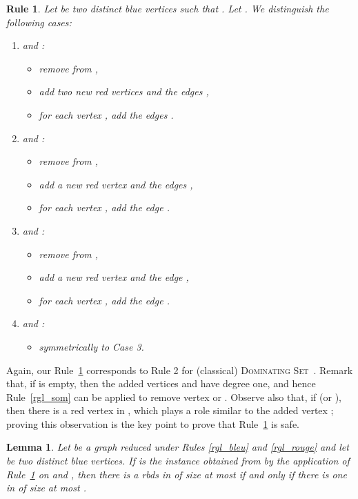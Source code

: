 \documentclass[a4paper,11pt]{article}
\newtheorem{lem}  {Lemma}
\newtheorem{rgl}  {Rule}
\newcommand{\rrgl}   [1] {Rule~\ref{#1}\xspace}
\newcommand{\dom}    [0] {\textsc{Dominating Set}\xspace}
\newcommand{\drb}    [0] {rbds\xspace}
\begin{document}
\begin{rgl}  \label{rgl_pair}            Let  be two distinct blue vertices such that .
Let .
We distinguish the following cases:
\begin{enumerate}

\item  and :

\begin{itemize}\itemsep0em
\item remove  from ,
\item add two new red vertices  and the edges ,
\item for each vertex , add the edges .
\end{itemize}



\item  and :

\begin{itemize}\itemsep0em
\item remove  from ,
\item add a new red vertex  and the edges ,
\item for each vertex {}, add the edge .
\end{itemize}

\item  and :

\begin{itemize}\itemsep0em
\item remove  from ,
\item add a new red vertex  and the edge ,
\item for each vertex {}, add the edge .


\end{itemize}

\item  and :

\begin{itemize}
\item symmetrically to Case 3.
\end{itemize}


\end{enumerate}
\end{rgl}





Again, our \rrgl{rgl_pair} corresponds to Rule 2 for (classical) \dom~\cite{AFN04}. Remark that, if  is empty, then the added vertices  and  have degree one, and hence \rrgl{rgl_som} can be applied to remove vertex  or . Observe also that, if  (or  ), then there is a red vertex in , which plays a role similar to the added vertex ; proving this observation is the key point to prove that \rrgl{rgl_pair} is safe. \begin{lem} \label{lem_corr_2}
Let  be a graph reduced under Rules \ref{rgl_bleu} and \ref{rgl_rouge} and let  be two distinct blue vertices.
If  is the instance obtained from  by the application of \rrgl{rgl_pair} on  and ,
then there is a \drb in  of size at most  if and only if there is one in  of size at most .
\end{lem}
\end{document}
